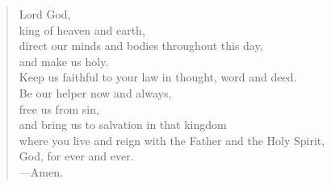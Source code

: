 \prayer

\setlength{\leftmargini}{\prayerleftmargini}

\begin{verse}
Lord God,\\
king of heaven and earth,\\
direct our minds and bodies throughout this day,\\
and make us holy.\\
Keep us faithful to your law in thought, word and deed.\\
Be our helper now and always,\\
free us from sin,\\
and bring us to salvation in that kingdom\\
where you live and reign with the Father and the Holy Spirit,\\
God, for ever and ever.\\
{\color{red}---\thinspace}Amen.
\end{verse}

\setlength{\leftmargini}{\defleftmargini}